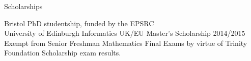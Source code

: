 \documentclass{resume} %
\begin{document}
\begin{rSection}{Scholarships}

Bristol PhD studentship, funded by the EPSRC \\
University of Edinburgh Informatics UK/EU Master's Scholarship 2014/2015 \\
Exempt from Senior Freshman Mathematics Final Exams by virtue of Trinity Foundation Scholarship exam results.

\end{rSection}

%
%

%
%

\end{document}
